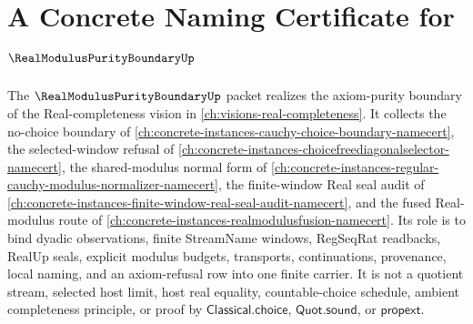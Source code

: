 \chapter{A Concrete Naming Certificate for $\RealModulusPurityBoundaryUp$}
\label{ch:concrete-instances-real-modulus-purity-boundary-namecert}

The $\RealModulusPurityBoundaryUp$ packet realizes the axiom-purity boundary of the Real-completeness vision in \autoref{ch:visions-real-completeness}. It collects the no-choice boundary of \autoref{ch:concrete-instances-cauchy-choice-boundary-namecert}, the selected-window refusal of \autoref{ch:concrete-instances-choicefreediagonalselector-namecert}, the shared-modulus normal form of \autoref{ch:concrete-instances-regular-cauchy-modulus-normalizer-namecert}, the finite-window Real seal audit of \autoref{ch:concrete-instances-finite-window-real-seal-audit-namecert}, and the fused Real-modulus route of \autoref{ch:concrete-instances-realmodulusfusion-namecert}. Its role is to bind dyadic observations, finite StreamName windows, RegSeqRat readbacks, RealUp seals, explicit modulus budgets, transports, continuations, provenance, local naming, and an axiom-refusal row into one finite carrier. It is not a quotient stream, selected host limit, host real equality, countable-choice schedule, ambient completeness principle, or proof by $\mathsf{Classical.choice}$, $\mathsf{Quot.sound}$, or $\mathsf{propext}$.




